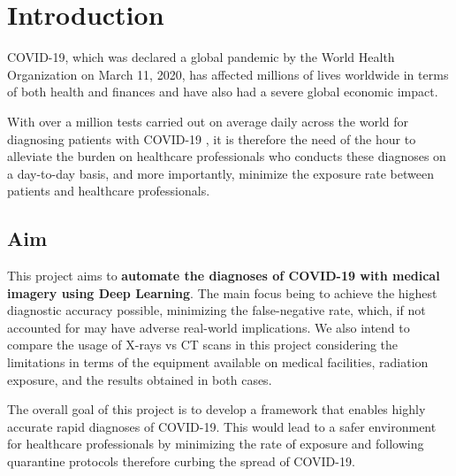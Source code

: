 
\chapter{Introduction} %

\label{ChapterX} %


COVID-19, which was declared a global pandemic by the World Health Organization on March 11, 2020, has affected
millions of lives worldwide in terms of both health and finances and have also had 
a severe global economic impact.

With over a million tests carried out on average daily across the world for diagnosing patients with COVID-19 \cite{OWD2020}, 
it is therefore the need of the hour to alleviate the burden on healthcare professionals who conducts these diagnoses on a day-to-day basis, 
and more importantly, minimize the exposure rate between patients and healthcare professionals.
\section{Aim}

This project aims to \textbf{automate the diagnoses of COVID-19 with medical imagery using Deep Learning}. The main focus being
to achieve the highest diagnostic accuracy possible, minimizing the false-negative rate, which, if not accounted for may have adverse real-world implications. 
We also intend to compare the usage of X-rays vs CT scans in this project considering 
the limitations in terms of the equipment available on medical facilities, radiation exposure, and the results obtained in both cases.

The overall goal of this project is to develop a framework that enables highly accurate rapid 
diagnoses of COVID-19. This would lead to a safer environment 
for healthcare professionals by minimizing the rate of exposure and following quarantine protocols 
therefore curbing the spread of COVID-19.

